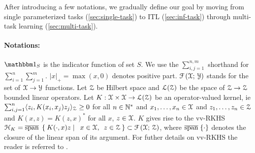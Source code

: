 %
%
%
%
%
%


After introducing a few notations, we gradually define our goal by
moving from single parameterized tasks (\cref{sec:single-task})  to \acs{ITL}
(\cref{sec:inf-task}) through multi-task learning (\cref{sec:multi-task}).
\paragraph{Notations:}
$\indicator{S}$ is the indicator function of set $S$. We use the $\sum_{i,j=1}^{n,m}$
shorthand for $\sum_{i=1}^n\sum_{j=1}^m$.  $|x|_+ = \max(x,0)$ denotes positive part.
$\mathcal{F}\left(\mathcal{X};\,\mathcal{Y}\right)$ stands for the set of $\mathcal{X}
\rightarrow \mathcal{Y}$ functions.  Let $\mathcal{Z}$ be Hilbert space and $\mathcal{L}(\mathcal{Z})$ be
the space of $\mathcal{Z} \to \mathcal{Z}$ bounded linear operators.  Let $K: \mathcal{X} \times
\mathcal{X} \to \mathcal{L}(\mathcal{Z})$ be an operator-valued kernel, \acs{ie} $\sum_{i,j=1}^n
\langle z_i, K(x_i,x_j)z_j\rangle_{\mathcal{Z}} \geq 0$ for all $n\in\mathbb{N}^*$ and $x_1, \ldots,
x_n \in \mathcal{X}$ and $z_1, \ldots, z_n \in \mathcal{Z}$ and $K(x, z)=K(z, x)^*$ for
all $x$, $z\in\mathcal{X}$.  $K$ gives rise to the \acl{vv-RKHS}
$\mathcal{H}_K = \operatorname{{\mathbf{\mathrm{\overline{span}}\;}}} \Set{K(\cdot,x)z |\enskip x \in
\ensuremath{\mathcal{X}},\enskip z \in \ensuremath{\mathcal{Z}}} \subset \mathcal{F}\left(\mathcal{X};\,\mathcal{Z}\right)$, where
$\operatorname{{\mathbf{\mathrm{\overline{span}}\;}}}\{\cdot\}$ denotes the closure of the linear span of its argument.  For
futher details on \ac{vv-RKHS} the reader is referred to
\citep{carmeli10vector}.
%
